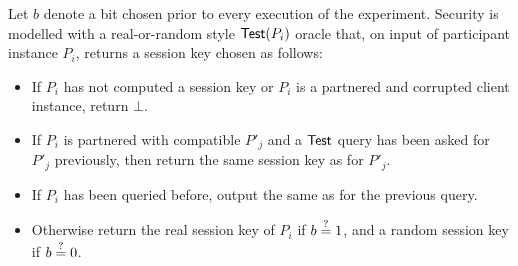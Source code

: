 \noindent
Let $b$ denote a bit chosen prior to every execution of the experiment.
Security is modelled with a real-or-random style $\mathsf{Test}(P_i)$ oracle that, on input of participant instance $P_i$, returns a session key \sk chosen as follows:
\begin{itemize}
	\item If $P_i$ has not computed a session key or $P_i$ is a partnered and corrupted client instance, return $\bot$.
	
	\item If $P_i$ is partnered with compatible $P'_j$ and a $\mathsf{Test}$ query has been asked for $P'_j$ previously, then return the same session key as for $P'_j$.
	
	\item If $P_i$ has been queried before, output the same as for the previous query.
	
	\item Otherwise return the real session key of $P_i$ if $b\stackrel{?}{=} 1$, and a random session key if $b\stackrel{?}{=} 0$.
\end{itemize}


